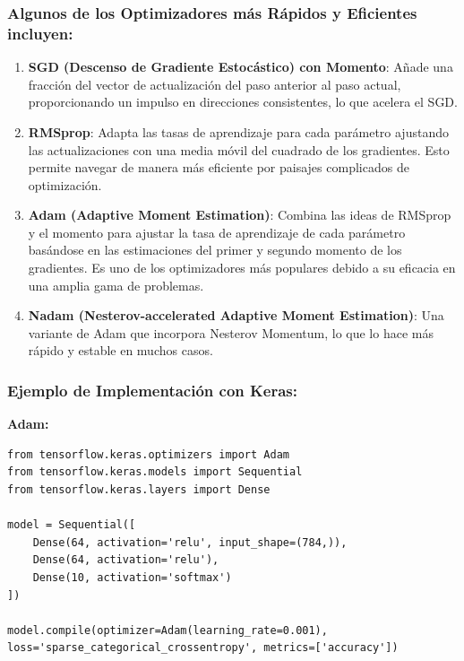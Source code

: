 \documentclass[11pt]{article}
\begin{document}
\subsubsection{Algunos de los Optimizadores más Rápidos y Eficientes incluyen:}
\label{sec:org46921cd}
\begin{enumerate}
\item \textbf{SGD (Descenso de Gradiente Estocástico) con Momento}: Añade una
fracción del vector de actualización del paso anterior al paso
actual, proporcionando un impulso en direcciones consistentes, lo que
acelera el SGD.

\item \textbf{RMSprop}: Adapta las tasas de aprendizaje para cada parámetro
ajustando las actualizaciones con una media móvil del cuadrado de los
gradientes. Esto permite navegar de manera más eficiente por paisajes
complicados de optimización.

\item \textbf{Adam (Adaptive Moment Estimation)}: Combina las ideas de RMSprop y
el momento para ajustar la tasa de aprendizaje de cada parámetro
basándose en las estimaciones del primer y segundo momento de los
gradientes. Es uno de los optimizadores más populares debido a su
eficacia en una amplia gama de problemas.

\item \textbf{Nadam (Nesterov-accelerated Adaptive Moment Estimation)}: Una
variante de Adam que incorpora Nesterov Momentum, lo que lo hace más
rápido y estable en muchos casos.
\end{enumerate}

\subsubsection{Ejemplo de Implementación con Keras:}
\label{sec:orgdd16d05}
\textbf{Adam:}

\begin{verbatim}
from tensorflow.keras.optimizers import Adam
from tensorflow.keras.models import Sequential
from tensorflow.keras.layers import Dense

model = Sequential([
    Dense(64, activation='relu', input_shape=(784,)),
    Dense(64, activation='relu'),
    Dense(10, activation='softmax')
])

model.compile(optimizer=Adam(learning_rate=0.001), loss='sparse_categorical_crossentropy', metrics=['accuracy'])
\end{verbatim}
\end{document}
